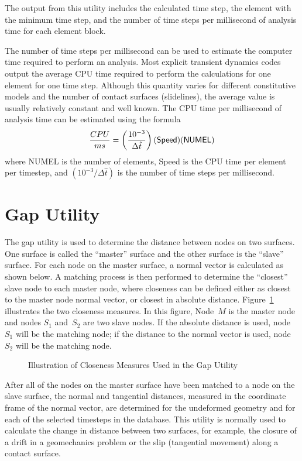 The output from this utility includes the calculated time step, the
element with the minimum time step, and the number of time steps per
millisecond of analysis time for each element block.

The number of time steps per millisecond can be used to estimate the
computer time required to perform an analysis.  Most explicit transient
dynamics codes output the average CPU time required to perform the
calculations for one element for one time step. Although this quantity
varies for different constitutive models and the number of contact
surfaces (slidelines), the average value is usually relatively constant
and well known.  The CPU time per millisecond of analysis time can be
estimated using the formula
\begin{equation}
{CPU\over ms} = \left(10^{-3}\over \Delta\hat t\right)
                ({\sf Speed})({\sf NUMEL})
\end{equation}
where {\sf NUMEL} is the number of elements, {\sf Speed} is the CPU time
per element per timestep, and $(10^{-3}/\Delta\hat t)$ is the number of
time steps per millisecond.

\section{Gap Utility}\label{sec:gap}

The gap utility is used to determine the distance between nodes on two
surfaces.  One surface is called the ``master'' surface and the other
surface is the ``slave'' surface.  For each node on the master surface,
a normal vector is calculated as shown below.  A matching process is
then performed to determine the ``closest'' slave node to each master
node, where closeness can be defined either as closest to the master
node normal vector, or closest in absolute distance.  Figure~\ref{f:gap}
illustrates the two closeness measures.  In this figure, Node~$M$ is the
master node and nodes $S_1$ and~$S_2$ are two slave nodes.  If the
absolute distance is used, node~$S_1$ will be the matching node; if the
distance to the normal vector is used, node~$S_2$ will be the matching
node.

\begin{figure}
\caption{Illustration of Closeness Measures Used in the Gap Utility}
\label{f:gap}
\end{figure}

After all of the nodes on the master surface have been matched to a node
on the slave surface, the normal and tangential distances, measured in
the coordinate frame of the normal vector, are determined for the
undeformed geometry and for each of the selected timesteps in the
database.  This utility is normally used to calculate the change in
distance between two surfaces, for example, the closure of a drift in a
geomechanics problem or the slip (tangential movement) along a contact
surface.

